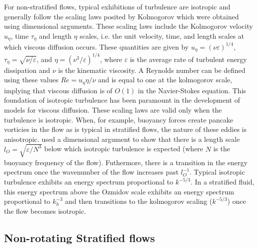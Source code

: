 \documentclass[lineno]{jfm}
\begin{document}
For non-stratified flows, typical exhibitions of turbulence
are isotropic and generally follow the scaling laws posited by
Kolmogorov \citet{Kolmogorov1941a, Kolmogorov1941b, Kolmogorov1941c} which were
obtained using dimensional arguments. These
scaling laws include the Kolmogorov velocity $u_{\eta}$, time $\tau_{\eta}$ and
length $\eta$ scales, i.e.
 the unit velocity, time, and length scales at which viscous diffusion occurs. These quantities
 are given by $u_{\eta} = (\nu\varepsilon)^{1/4}$, $\tau_{\eta} =
 \sqrt{\nu/\varepsilon}$, and $\eta = (\nu^3/\varepsilon)^{1/4}$, where $\varepsilon$ is the average rate of
turbulent energy dissipation and $\nu$ is the kinematic viscosity. A Reynolds
number can be defined using these values $Re = u_{\eta}\eta/\nu$ and is equal to
one at the kolmogorov scale, implying that viscous diffusion is of $O(1)$ in the
Navier-Stokes equation. This foundation of isotropic turbulence has been
paramount in the development of models for viscous diffusion. These scaling laws
are valid only when the turbulence is isotropic. When, for example,
buoyancy forces create pancake vorticies in the flow as is typical in stratified
flows, the nature of these eddies is anisotropic. \cite{Ozmidov1965} used a dimensional
argument to show that there is a length scale $l_O = \sqrt{\varepsilon/N^3}$
below which isotropic turbulence is expected (where $N$ is the buoyancy
frequency of the flow). {\red Futhermore, there is a transition in the energy spectrum
once the wavenumber of the flow increases past $l_O^{-1}$. Typical isotropic
turbulence exhibits an energy spectrum proportional to $k^{-5/3}$. In a
stratified fluid, this energy spectrum above the Ozmidov scale exhibits an
energy spectrum proportional to $k_h^{-3}$ and then transitions to the kolmogorov
scaling ($k^{-5/3}$) once the flow becomes isotropic.}

\subsection{Non-rotating Stratified flows}
\end{document}
